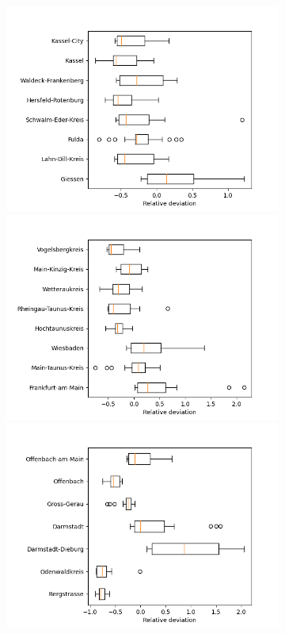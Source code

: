 \begin{figure}
	\centering
	\begin{subfigure}[b]{0.32\textwidth}
		\centering
		\caption*{}
		\includegraphics[width=\textwidth]{./figures/76d/deviation_box76_1.png}	
		\includegraphics[width=\textwidth]{./figures/76d/deviation_box76_2.png}	
		\includegraphics[width=\textwidth]{./figures/76d/deviation_box76_3.png}	

\end{subfigure}
\end{figure}
